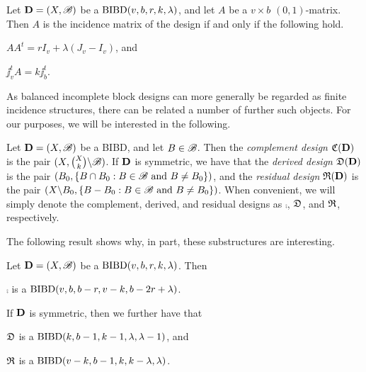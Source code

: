 \documentclass[../../../main]{subfiles}
\begin{document}
\begin{prop}\label{incidence prop}
 Let $\mathbf{D}=(X,\mathscr{B})$ be a $\text{BIBD}(v,b,r,k,\lambda)$, and let $A$ be a $v \times b$ $(0,1)$-matrix. Then $A$ is the incidence matrix of the design if and only if the following hold.
 \begin{defenum}
 \item\label{inc1} $AA^t = rI_v + \lambda(J_v - I_v)$, and
  \item\label{inc2} $\jj_v^tA = k\jj_b^t$.
 \end{defenum}
\end{prop}

As balanced incomplete block designs can more generally be regarded as finite
incidence structures, there can be related a number of further such objects. For our purposes, we will be interested in the following. 

\begin{defin}\label{res-der}
 Let $\mathbf{D}=(X,\mathscr{B})$ be a BIBD, and let $B \in \mathscr{B}$. Then the {\it complement design} $\mathfrak{C}(\mathbf{D})$ is the pair $(X,\binom{X}{k} \backslash \mathscr{B})$. If $\mathbf{D}$ is symmetric, we have that the {\it derived design} $\mathfrak{D}(\mathbf{D})$ is the pair $(B_0, \{B \cap B_0 : B \in \mathscr{B} \text{ and } B \neq B_0\})$, and the {\it residual design} $\mathfrak{R}(\mathbf{D})$ is the pair $(X \backslash B_0, \{B - B_0 : B \in \mathscr{B} \text{ and } B \neq B_0\})$. When convenient, we will simply denote the complement, derived, and residual designs as $\comp$, $\mathfrak{D}$, and $\mathfrak{R}$, respectively.
\end{defin}

The following result shows why, in part, these substructures are interesting.

\begin{prop}\label{res-der-params}
 Let $\mathbf{D}=(X,\mathscr{B})$ be a $\text{BIBD}(v,b,r,k,\lambda)$. Then
 \begin{defenum}
  \item\label{comp-parameters} $\comp$ is a $\text{BIBD}(v,b,b-r,v-k,b-2r+\lambda)$.
 \end{defenum}
 If $\mathbf{D}$ is symmetric, then we further have that
 \begin{defenum}[resume]
  \item\label{der-parameters} $\mathfrak{D}$ is a $\text{BIBD}(k,b-1,k-1,\lambda,\lambda-1)$, and 
  \item\label{res-parameters} $\mathfrak{R}$ is a $\text{BIBD}(v-k,b-1,k,k-\lambda,\lambda)$.
 \end{defenum}
\end{prop}
\end{document}
